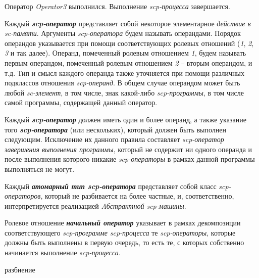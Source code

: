 Оператор \textit{Operator3} выполнился. Выполнение \textit{scp-процесса} завершается.

\begin{SCn}
\end{SCn}

Каждый \textbf{\textit{scp-оператор}} представляет собой некоторое элементарное \textit{действие в sc-памяти}. Аргументы \textit{scp-оператора} будем называть операндами. Порядок операндов указывается при помощи соответствующих ролевых отношений (\textit{1\scnrolesign}, \textit{2\scnrolesign}, \textit{3\scnrolesign} и так далее). Операнд, помеченный ролевым отношением \textit{1\scnrolesign}, будем называть первым операндом, помеченный ролевым отношением \textit{2\scnrolesign} – вторым операндом, и т.д. Тип и смысл каждого операнда также уточняется при помощи различных подклассов отношения \textit{scp-операнд\scnrolesign}. В общем случае операндом может быть любой \textit{sc-элемент}, в том числе, знак какой-либо \textit{scp-программы}, в том числе самой программы, содержащей данный оператор.

Каждый \textbf{\textit{scp-оператор}} должен иметь один и более операнд, а также указание того \textbf{\textit{scp-оператора}} (или нескольких), который должен быть выполнен следующим. Исключение их данного правила составляет \textit{scp-оператор завершения выполнения программы}, который не содержит ни одного операнда и после выполнения которого никакие \textit{scp-операторы} в рамках данной программы выполняться не могут.

Каждый \textbf{\textit{атомарный тип scp-оператора}} представляет собой класс \textit{scp-операторов}, который не разбивается на более частные, и, соответственно, интерпретируется реализацией \textit{Aбстрактной scp-машины}.

\begin{SCn}
\scnsubset{1\scnrolesign}
\end{SCn}

Ролевое отношение \textbf{\textit{начальный оператор\scnrolesign}} указывает в рамках декомпозиции соответствующего \textit{\mbox{scp-программе}} \textit{scp-процесса} те \textit{scp-операторы}, которые должны быть выполнены в первую очередь, то есть те, с которых собственно начинается выполнение \textit{scp-процесса}.

\begin{SCn}
\begin{scnrelfromset}{разбиение}
\end{scnrelfromset}
\end{SCn}

